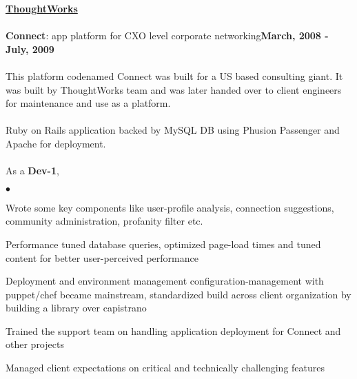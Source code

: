 \documentclass[margin,line]{res}
\newenvironment{list2}{
  \begin{list}{$\bullet$}{%
      \setlength{\itemsep}{0in}
      \setlength{\parsep}{0in} \setlength{\parskip}{0in}
      \setlength{\topsep}{0in} \setlength{\partopsep}{0in} 
      \setlength{\leftmargin}{0.2in}}}{\end{list}}
\begin{document}
\begin{resume}
{\underline {\bf ThoughtWorks}}\\
\\
{\bf Connect}: app platform for CXO level corporate networking\hfill {\bf March, 2008 - July, 2009}\\
\vspace{-.2cm}\\
This platform codenamed Connect was built for a US based consulting giant. It was built by ThoughtWorks team and was later handed over to client engineers for maintenance and use as a platform.\\
\\
Ruby on Rails application backed by MySQL DB using Phusion Passenger and Apache for deployment.\\
\\
As a {\bf Dev-1}, 
\begin{list2}
\item Wrote some key components like user-profile analysis, connection suggestions, community administration, profanity filter etc.
\item Performance tuned database queries, optimized page-load times and tuned content for better user-perceived performance
\item Deployment and environment management configuration-management with puppet/chef became mainstream, standardized build across client organization by building a library over capistrano
\item Trained the support team on handling application deployment for Connect and other projects
\item Managed client expectations on critical and technically challenging features
\end{list2}


\end{resume}
\end{document}
